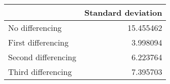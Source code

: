 \begin{tabular}{lr}
\toprule
 & Standard deviation \\
\midrule
No differencing & 15.455462 \\
First differencing & 3.998094 \\
Second differencing & 6.223764 \\
Third differencing & 7.395703 \\
\bottomrule
\end{tabular}
